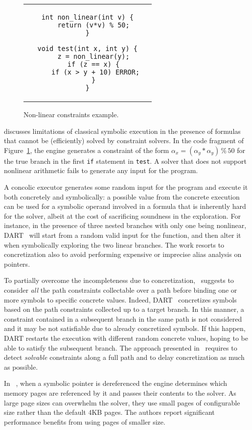 \begin{figure}[t]
\begin{center}
\begin{tabular}{c}
\begin{lstlisting}[basicstyle=\ttfamily\small]
int non_linear(int v) {
   return (v*v) % 50;
}

void test(int x, int y) {
   z = non_linear(y);
   if (z == x) {
      if (x > y + 10) ERROR;  
   }
}
\end{lstlisting}
\end{tabular}
\end{center}
\caption{Non-linear constraints example.}
\label{fi:non-linear-constraints}
\end{figure}


\medskip{}
\cite{CS-CACM13} discusses limitations of classical symbolic execution in the presence of formulas that cannot be (efficiently) solved by constraint solvers. In the code fragment of Figure~\ref{fi:non-linear-constraints}, the engine generates a constraint of the form $\alpha_x = (\alpha_y*\alpha_y)\,\%\,50$ for the true branch in the first {\tt if} statement in {\tt test}. A solver that does not support nonlinear arithmetic fails to generate any input for the program.

A concolic executor generates some random input for the program and execute it both concretely and symbolically: a possible value from the concrete execution can be used for a symbolic operand involved in a formula that is inherently hard for the solver, albeit at the cost of sacrificing soundness in the exploration. For instance, in the presence of three nested branches with only one being nonlinear, {\sc DART}~\cite{DART-PLDI05} will start from a random valid input for the function, and then alter it when symbolically exploring the two linear branches. The work resorts to concretization also to avoid performing expensive or imprecise alias analysis on pointers. %

To partially overcome the incompleteness due to concretization,~\cite{PRV-ISSTA11} suggests to consider {\em all} the path constraints collectable over a path before binding one or more symbols to specific concrete values. Indeed, {\sc DART}~\cite{DART-PLDI05} concretizes symbols based on the path constraints collected up to a target branch. In this manner, a constraint contained in a subsequent branch in the same path is not considered and it may be not satisfiable due to already concretized symbols. If this happen, {\sc DART} restarts the execution with different random concrete values, hoping to be able to satisfy the subsequent branch. The approach presented in~\cite{PRV-ISSTA11} requires to detect {\em solvable} constraints along a full path and to delay concretization as much as possible.

In {\sc \stwoe}~\cite{CKC-TOCS12}, when a symbolic pointer is dereferenced the engine determines which memory pages are referenced by it and passes their contents to the solver. As large page sizes can overwhelm the solver, they use small pages of configurable size rather than the default 4KB pages. The authors report significant performance benefits from using pages of smaller size.
